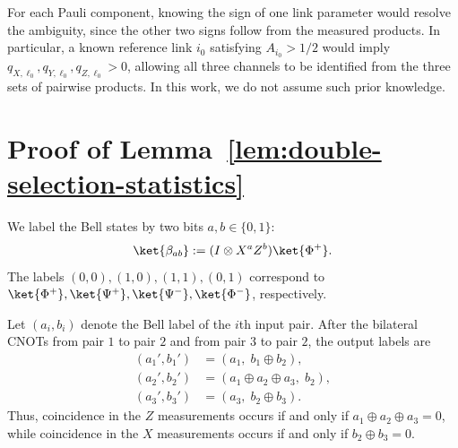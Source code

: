 For each Pauli component, knowing the sign of one link parameter
would resolve the ambiguity, since the other two signs follow from
the measured products. In particular, a known reference link
\(i_0\) satisfying \(A_{i_0}>1/2\) would imply
\(q_{X,\ell _0},q_{Y,\ell _0},q_{Z,\ell _0}>0\), allowing all three channels
to be identified from the three sets of pairwise products.
In this work, we do not assume such prior knowledge. 

\section{Proof of Lemma~\ref{lem:double-selection-statistics}}
\label{app:double-selection}

We label the Bell states by two bits \(a,b\in\{0,1\}\):
\begin{equation}
\ket{\beta_{ab}}
:=
(I\otimes X^aZ^b)\ket{\Phi^+}.
\end{equation}
The labels \((0,0),(1,0),(1,1),(0,1)\) correspond to
\(\ket{\Phi^+},\ket{\Psi^+},\ket{\Psi^-},\ket{\Phi^-}\),
respectively.

Let \((a_i,b_i)\) denote the Bell label of the \(i\)th input pair.
After the bilateral CNOTs from pair \(1\) to pair \(2\) and from
pair \(3\) to pair \(2\), the output labels are
\begin{equation}
\begin{aligned}
(a_1',b_1')
&=(a_1,\;b_1\oplus b_2),\\
(a_2',b_2')
&=(a_1\oplus a_2\oplus a_3,\;b_2),\\
(a_3',b_3')
&=(a_3,\;b_2\oplus b_3).
\end{aligned}
\label{eq:double-selection-bell-labels}
\end{equation}
Thus, coincidence in the \(Z\) measurements occurs if and only if
\(a_1\oplus a_2\oplus a_3=0\), while coincidence in the \(X\)
measurements occurs if and only if \(b_2\oplus b_3=0\).

